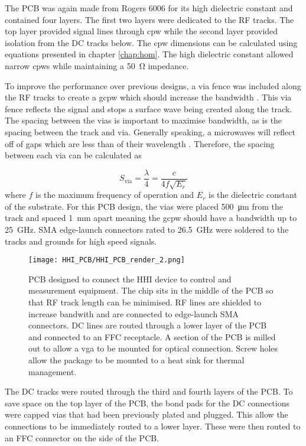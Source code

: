 The PCB was again made from Rogers 6006 for its high dielectric constant and contained four layers. The first two layers were dedicated to the RF tracks. The top layer provided signal lines through \ac{cpw} while the second layer provided isolation from the DC tracks below. The \ac{cpw} dimensions can be calculated using equations presented in chapter \ref{chap:hom}. The high dielectric constant allowed narrow \acp{cpw} while maintaining a \SI{50}{\ohm} impedance. 

To improve the performance over previous designs, a via fence was included along the RF tracks to create a \ac{gcpw} which should increase the bandwidth \cite{haydl2002use}. This via fence reflects the signal and stops a surface wave being created along the track. The spacing between the vias is important to maximise bandwidth, as is the spacing between the track and via. Generally speaking, a microwaves will reflect off of gaps which are less than  of their wavelength \cite{Sain2016}. Therefore, the spacing between each via can be calculated as 

\begin{equation}
	S_\text{via} = \frac{\lambda}{4} = \frac{c}{4 f \sqrt{E_r}}
\end{equation}
where $f$ is the maximum frequency of operation and $E_r$ is the dielectric constant of the substrate. For this PCB design, the vias were placed \SI{500}{\um} from the track and spaced \SI{1}{\mm} apart meaning the \ac{gcpw} should have a bandwidth up to \SI{25}{GHz}. SMA edge-launch connectors rated to \SI{26.5}{GHz} were soldered to the tracks and grounds for high speed signals.

\begin{figure}[tbp]
	\centering
	\texttt{[image: HHI\_PCB/HHI\_PCB\_render\_2.png]}
	\caption[PCB breakout for an InP integrated circuit]{PCB designed to connect the HHI device to control and measurement equipment. The chip sits in the middle of the PCB so that RF track length can be minimised. RF lines are shielded to increase bandwith and are connected to edge-launch SMA connectors. DC lines are routed through a lower layer of the PCB and connected to an FFC receptacle. A section of the PCB is milled out to allow a \ac{vga} to be mounted for optical connection. Screw holes allow the package to be mounted to a heat sink for thermal management.}
	\label{fig:hhi_pcb}
\end{figure}

The DC tracks were routed through the third and fourth layers of the PCB. To save space on the top layer of the PCB, the bond pads for the DC connections were capped vias that had been previously plated and plugged. This allow the connections to be immediately routed to a lower layer. These were then routed to an FFC connector on the side of the PCB.

